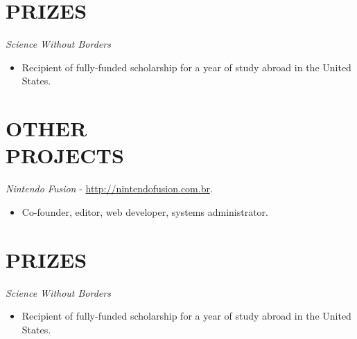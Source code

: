 \documentclass[margin]{res}
\begin{document}
\begin{resume}
		\section{PRIZES}
			{\sl Science Without Borders}
			\begin{itemize}
				\item[] Recipient of fully-funded scholarship for a year of study abroad in the United States.
			\end{itemize}

			
		\section{OTHER \\ PROJECTS}
			{\sl Nintendo Fusion} - \href{http://nintendofusion.com.br}{http://nintendofusion.com.br}.
			\begin{itemize}
				\item[] Co-founder, editor, web developer, systems administrator.
			\end{itemize}
	
		\section{PRIZES}
			{\sl Science Without Borders}
			\begin{itemize}
				\item[] Recipient of fully-funded scholarship for a year of study abroad in the United States.
			\end{itemize}



\end{resume}
\end{document}
